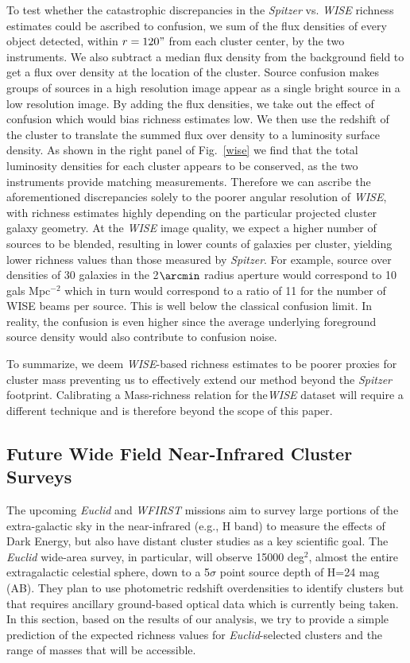 \documentclass[apj,twocolumn]{emulateapj}
\begin{document}
{ To test whether the catastrophic discrepancies in the  {\it Spitzer} vs. {\it WISE} richness estimates could be ascribed to confusion, we sum of the flux densities of every object detected, within $r=120"$ from each cluster center, by the two instruments. We also subtract a median flux density from the background field to get a flux over density at the location of the cluster.
 Source confusion makes groups of sources in a high resolution image appear as a single bright
 source in a low resolution image. By adding the flux densities, we take out the effect of confusion which would bias richness estimates low.
 We then use the redshift of the cluster to translate the summed flux over density to a luminosity surface density.
As shown in the right panel of  Fig.~\ref{wise} we find that the total luminosity densities for each cluster appears to be conserved, as the two instruments provide matching measurements.  Therefore we can ascribe the aforementioned discrepancies solely to the poorer angular resolution of {\it WISE}, with richness estimates highly depending on the particular projected cluster galaxy geometry. At  the {\it WISE} image quality, we expect a higher number of sources to be blended, resulting in lower counts of galaxies per cluster, yielding lower richness values than those measured by {\it Spitzer}. 
For example, source over densities of 30 galaxies in the 2$\arcmin$ radius aperture would correspond to 10 gals Mpc$^{-2}$ which in turn would correspond to a ratio of 11 for the number of WISE beams
per source. This is well below the classical confusion limit. In reality, the confusion is even higher since the average underlying foreground source density would also contribute to confusion noise.

To summarize, we deem {\it WISE}-based richness estimates to be poorer proxies for cluster mass preventing us to effectively extend our method beyond the {\it Spitzer} footprint. Calibrating a Mass-richness relation for the{\it WISE} dataset will require a different technique and is therefore beyond the scope of this paper.

\subsection{Future Wide Field Near-Infrared Cluster Surveys}

The upcoming {\it Euclid} and {\it WFIRST} missions aim to survey large portions of the extra-galactic sky in the near-infrared (e.g., H band) to measure the effects of Dark Energy, but also have distant cluster studies as a key scientific goal. The {\it Euclid} wide-area survey, in particular, will observe 15000 deg$^{2}$, almost the entire extragalactic celestial sphere,  down to a 5$\sigma$ point source
depth of H=24 mag (AB).  They plan to use photometric redshift overdensities to identify clusters but that requires ancillary ground-based optical data which is currently being taken.
In this section, based on the results of our analysis,  we try to provide a simple prediction of  the expected richness values for  {\it Euclid}-selected clusters and the range of masses that will be accessible. 

}
\end{document}
